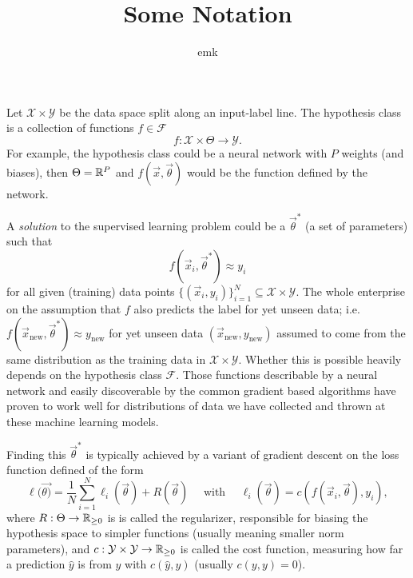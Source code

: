\documentclass[12pt]{amsart}
\title{Some Notation}
\author{emk}
\newcommand{\calX}{\mathcal{X}}
\newcommand{\calY}{\mathcal{Y}}
\begin{document}
\maketitle

Let $\calX \times \calY$ be the data space split along an input-label line. The hypothesis class is a collection of functions $f \in \mathcal{F}$
\[
	f : \calX \times \Theta \to \calY.
\]
For example, the hypothesis class could be a neural network with $P$ weights (and biases), then $\Theta = \mathbb{R}^P$ and $f(\vec{x}, \vec{\theta})$ would be the function defined by the network.

A \emph{solution} to the supervised learning problem could be a $\vec{\theta}^*$ (a set of parameters) such that $$f(\vec{x}_i, \vec{\theta}^*) \approx y_i$$
for all given (training) data points $\{(\vec{x}_i, y_i)\}_{i = 1}^N \subseteq \calX \times \calY$. The whole enterprise on the assumption that $f$ also predicts the label for yet unseen data; i.e. $f(\vec{x}_{\text{new}}, \vec{\theta}^*) \approx y_{\text{new}}$ for yet unseen data $(\vec{x}_{\text{new}}, y_{\text{new}})$ assumed to come from the same distribution as the training data in $\calX \times \calY$. Whether this is possible heavily depends on the hypothesis class $\mathcal{F}$. Those functions describable by a neural network and easily discoverable by the common gradient based algorithms have proven to work well for distributions of data we have collected and thrown at these machine learning models.

Finding this $\vec \theta^*$ is typically achieved by a variant of gradient descent on the loss function defined of the form
\begin{equation}\label{eq:lossfn}
	\ell(\vec{\theta)} = \frac{1}{N} \sum_{i = 1}^N \ell_i(\vec{\theta}) + R(\vec{\theta}) \quad \text{ with } \quad \ell_i(\vec{\theta}) = c(f(\vec{x}_i, \vec{\theta}), y_i),
\end{equation}
where $R :\Theta \to \mathbb{R}_{\geq 0 }$ is is called the regularizer, responsible for biasing the hypothesis space to simpler functions (usually meaning smaller norm parameters), and $c : \calY \times \calY \to \R_{\geq 0}$ is called the cost function, measuring how far a prediction $\hat y$ is from $y$ with  $c(\hat y, y)$ (usually $c(y, y) = 0$). 
\end{document}
